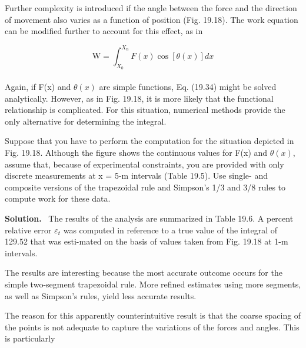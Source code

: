 \documentclass[../main.tex]{subfiles}
\begin{document}
Further complexity is introduced if the angle between the force and the direction of
movement also varies as a function of position (Fig. 19.18). The work equation can be
modified further to account for this effect, as in

\begin{equation}
	\tag{19.34}
	\mathrm{W}=\int^{X_{n}}_{X_{0}}F(x)\cos[\theta(x)]dx
\end{equation}\\
Again, if F(x) and $\theta(x)$ are simple functions, Eq. (19.34) might be solved analytically. However, as in Fig. 19.18, it is more likely that the functional relationship is complicated. For
this situation, numerical methods provide the only alternative for determining the integral.

Suppose that you have to perform the computation for the situation depicted in
Fig. 19.18. Although the figure shows the continuous values for F(x) and 
$\theta(x)$, assume that, 
because of experimental constraints, you are provided with only discrete measurements at
x = 5-m intervals (Table 19.5). Use single- and composite versions of the trapezoidal rule
and Simpson's 1/3 and 3/8 rules to compute work for these data.

\vspace{0.1in}

\large\textbf{Solution.} \, The results of the analysis are summarized in
Table 19.6. A percent relative error $\varepsilon_{t}$ was computed in reference to a true value of the integral of 129.52 that was esti-mated on the basis of values taken from Fig. 19.18 at 1-m intervals.

The results are interesting because the most accurate outcome occurs for the simple
two-segment trapezoidal rule. More refined estimates using more segments, as well as
Simpson's rules, yield less accurate results. 

The reason for this apparently counterintuitive result is that the coarse spacing of the
points is not adequate to capture the variations of the forces and angles. This is particularly
\end{document}
